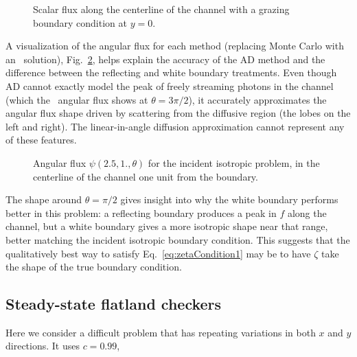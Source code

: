 \begin{figure}[htb]
  \centering\small
  \hspace{-.5in}
  
  \hspace{-.5in}
  \caption{Scalar flux along the centerline of the channel with a grazing
  boundary condition at $y=0$.}
  \label{fig:bcChannelGrazing}
\end{figure}

A visualization of the angular flux for each method (replacing Monte Carlo with
an \SN\ solution), Fig.~\ref{fig:bcChannelIsotropicAngular}, helps explain the
accuracy
of the AD method and the difference between the reflecting and white boundary
treatments. Even though AD cannot exactly model the peak of freely streaming
photons in the channel (which the \SN\ angular flux shows at $\theta=3\pi/2$),
it accurately approximates the angular flux shape driven by scattering from the
diffusive region (the lobes on the left and right).
The linear-in-angle diffusion approximation cannot represent any of these
features.  

\begin{figure}[htb!]
  \centering\small
  \vspace{-.25in}
  \hspace{-.5in}
  
  \hspace{-.5in}
  \vspace{-.25in}
  \caption{Angular flux $\psi(2.5, 1., \theta)$ for the incident isotropic
  problem, in the centerline of the channel one unit from the boundary.}
  \label{fig:bcChannelIsotropicAngular}
\end{figure}

The shape around $\theta=\pi/2$ gives insight into why the white boundary
performs better in this problem: a reflecting boundary produces a peak in $f$
along the channel, but a white boundary gives a more isotropic shape near that
range, better matching the incident isotropic boundary condition. This suggests
that the qualitatively best way to satisfy Eq.~\eqref{eq:zetaCondition1} may be
to have $\zeta$ take the shape of the true boundary condition.

\clearpage
\subsection{Steady-state flatland checkers}

Here we consider a difficult problem that has repeating variations in both $x$
and $y$ directions. It uses $c=0.99$, 

